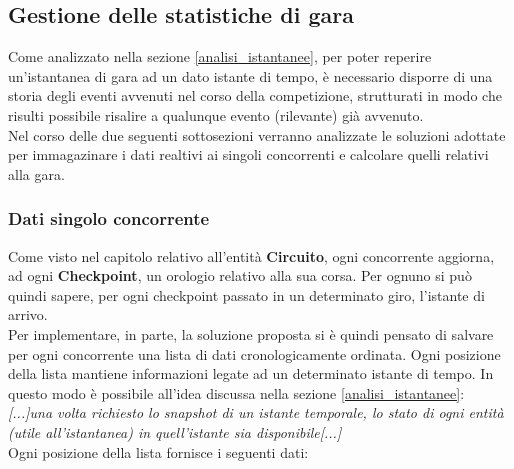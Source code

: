 \subsection{Gestione delle statistiche di gara}
\label{statistiche}
Come analizzato nella sezione \ref{analisi_istantanee}, per poter reperire un'istantanea di gara ad un dato istante di tempo, è necessario
disporre di una storia degli eventi avvenuti nel corso della competizione, strutturati in modo che risulti possibile risalire a qualunque evento
(rilevante) già avvenuto.\\ 
Nel corso delle due seguenti sottosezioni verranno analizzate le soluzioni adottate per immagazinare i dati realtivi ai singoli concorrenti
e calcolare quelli relativi alla gara.
     \subsubsection{Dati singolo concorrente}
     Come visto nel capitolo relativo all'entità \textbf{Circuito}, ogni concorrente aggiorna, ad ogni 
     \textbf{Checkpoint}, un orologio relativo alla sua corsa. Per ognuno si può quindi sapere, per ogni checkpoint passato in un determinato giro,
     l'istante di arrivo.\\
     Per implementare, in parte, la soluzione proposta si è quindi pensato di salvare per ogni concorrente una lista di dati cronologicamente ordinata.
     Ogni posizione della lista mantiene informazioni legate ad un determinato istante di tempo. In questo modo è possibile all'idea discussa nella
     sezione \ref{analisi_istantanee}:\\
     \emph{[...]una volta richiesto lo snapshot di un istante temporale, lo stato di ogni entità (utile all'istantanea) in 
     quell'istante sia disponibile[...]}\\
     Ogni posizione della lista fornisce i seguenti dati:
